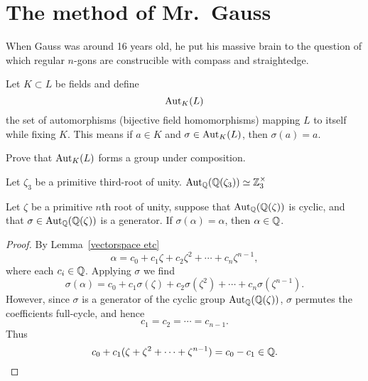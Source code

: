 \documentclass{ximera}
\begin{document}
\section{The method of Mr.\ Gauss}

When Gauss was around 16 years old, he put his massive brain to the
question of which regular $n$-gons are construcible with compass and
straightedge. 


\begin{definition}
  Let $K\subset L$ be fields and define
  \[
  \operatorname{Aut}_K(L) 
  \]
  the set of automorphisms (bijective field homomorphisms) mapping $L$
  to itself while fixing $K$. This means if $a\in K$ and $\sigma \in
  \operatorname{Aut}_K(L)$, then $\sigma(a) = a$.
\end{definition}

\begin{exercise}
  Prove that $\operatorname{Aut}_K(L)$ forms a group under composition.
\end{exercise}

\begin{example}
  Let $\zeta_3$ be a primitive third-root of
  unity. $\operatorname{Aut}_{\mathbb Q}(\mathbb Q(\zeta_3))\simeq\mathbb Z_3^\times$
\end{example}


\begin{lemma}
  Let $\zeta$ be a primitive $n$th root of unity, suppose that
  $\operatorname{Aut}_{\mathbb Q}(\mathbb Q(\zeta))$ is cyclic, and that
  $\sigma\in\operatorname{Aut}_{\mathbb Q}(\mathbb Q(\zeta))$ is a generator. If $\sigma(\alpha) =
  \alpha$, then $\alpha\in \mathbb Q$.
  \begin{proof}
    By Lemma~\ref{vectorspace etc}
    \[
    \alpha = c_0 + c_1 \zeta + c_2 \zeta^2 + \cdots + c_n\zeta^{n-1},
    \]
    where each $c_i\in \mathbb Q$. Applying $\sigma$ we find
    \[
    \sigma(\alpha) = c_0 + c_1 \sigma(\zeta) + c_2 \sigma(\zeta^2) + \cdots + c_n\sigma(\zeta^{n-1}).
    \]
    However, since $\sigma$ is a generator of the cyclic group
    $\operatorname{Aut}_{\mathbb Q}(\mathbb Q(\zeta))$, $\sigma$ permutes the coefficients
    full-cycle, and hence
    \[
    c_1 = c_2 = \cdots = c_{n-1}.
    \]
    Thus
    \[
    c_0 + c_1 (\zeta + \zeta^2 + \cdots + \zeta^{n-1}) = c_0 - c_1\in \mathbb Q.
    \]
  \end{proof}
\end{lemma}





\begin{example}
  
\end{example}
\end{document}
